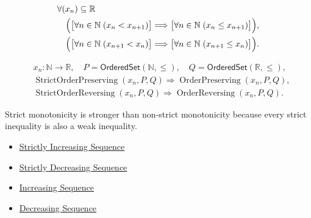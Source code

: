 \begin{remark*}
\[
\begin{aligned}
&\forall (x_n)\subseteq\mathbb{R}\\
&\quad\Bigl(
  \bigl[\forall n\in\mathbb{N}\;(x_n<x_{n+1})\bigr]
  \Longrightarrow
  \bigl[\forall n\in\mathbb{N}\;(x_n\le x_{n+1})\bigr]
\Bigr),\\
&\quad\Bigl(
  \bigl[\forall n\in\mathbb{N}\;(x_{n+1}<x_n)\bigr]
  \Longrightarrow
  \bigl[\forall n\in\mathbb{N}\;(x_{n+1}\le x_n)\bigr]
\Bigr).
\end{aligned}
\]
\end{remark*}

\begin{remark*}
\[
\begin{aligned}
&x_n\colon\mathbb{N}\to\mathbb{R},\quad
P=\mathsf{OrderedSet}(\mathbb{N},\leq),\quad
Q=\mathsf{OrderedSet}(\mathbb{R},\leq),\\
&\operatorname{StrictOrderPreserving}(x_n,P,Q)
\Longrightarrow
\operatorname{OrderPreserving}(x_n,P,Q),\\
&\operatorname{StrictOrderReversing}(x_n,P,Q)
\Longrightarrow
\operatorname{OrderReversing}(x_n,P,Q).
\end{aligned}
\]
\end{remark*}

\begin{remark*}[Interpretation]
Strict monotonicity is stronger than non-strict monotonicity because every
strict inequality is also a weak inequality.
\end{remark*}

\begin{dependencies}
\begin{itemize}
  \item \hyperref[def:strictly-increasing-sequence]{Strictly Increasing Sequence}
  \item \hyperref[def:strictly-decreasing-sequence]{Strictly Decreasing Sequence}
  \item \hyperref[def:increasing-sequence]{Increasing Sequence}
  \item \hyperref[def:decreasing-sequence]{Decreasing Sequence}
\end{itemize}
\end{dependencies}



